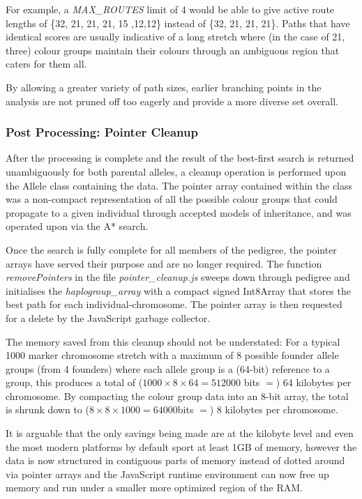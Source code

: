 \begin{description}
{For example,  a \textit{MAX\_ROUTES} limit of 4 would be able to give active route lengths of \{32,  21, 21, 21, 15 ,12,12\} instead of \{32, 21, 21, 21\}. Paths that have identical scores are usually indicative of a long stretch where (in the case of 21, three) colour groups maintain their colours through an ambiguous region that caters for them all.

By allowing a greater variety of path sizes, earlier branching points in the analysis are not pruned off too eagerly and provide a more diverse set overall.}

\end{description}

\subsubsection{Post Processing: Pointer Cleanup}

After the processing is complete and the result of the best-first search is returned unambiguously for both parental alleles, a cleanup operation is performed upon the Allele class containing the data. The pointer array contained within the class was a non-compact representation of all the possible colour groups that could propagate to a given individual through accepted models of inheritance, and was operated upon via the A* search.

Once the search is fully complete for all members of the pedigree, the pointer arrays have served their purpose and are no longer required. The function \textit{removePointers} in the file \textit{pointer\_cleanup.js} sweeps down through pedigree and initialises the \textit{haplogroup\_array} with a compact signed Int8Array that stores the best path for each individual-chromosome. The pointer array is then requested for a delete by the JavaScript garbage collector.

The memory saved from this cleanup should not be understated: For a typical 1000 marker chromosome stretch with a maximum of 8 possible founder allele groups (from 4 founders) where each allele group is a (64-bit) reference to a group, this produces a total of ($1000 \times 8 \times 64 = 512000$ bits $=$) 64 kilobytes per chromosome. By compacting the colour group data into an 8-bit array, the total is shrunk down to ($8 \times 8 \times 1000 = 64000 $bits $=$) 8 kilobytes per chromosome.

It is arguable that the only savings being made are at the kilobyte level and even the most modern platforms by default sport at least 1GB of memory, however the data is now structured in contiguous parts of memory instead of dotted around via pointer arrays and the JavaScript runtime environment can now free up memory and run under a smaller more optimized region of the RAM.


